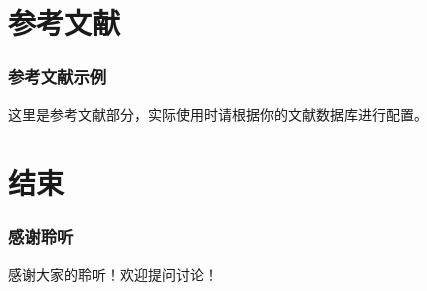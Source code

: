 \documentclass[10pt,aspectratio=169,mathserif]{beamer}
\begin{document}
\section{参考文献}
\begin{frame}[allowframebreaks]
    \frametitle{参考文献示例}
    这里是参考文献部分，实际使用时请根据你的文献数据库进行配置。
\end{frame}

\section{结束}
\begin{frame}
    \frametitle{感谢聆听}
    感谢大家的聆听！欢迎提问讨论！
\end{frame}
\end{document}
